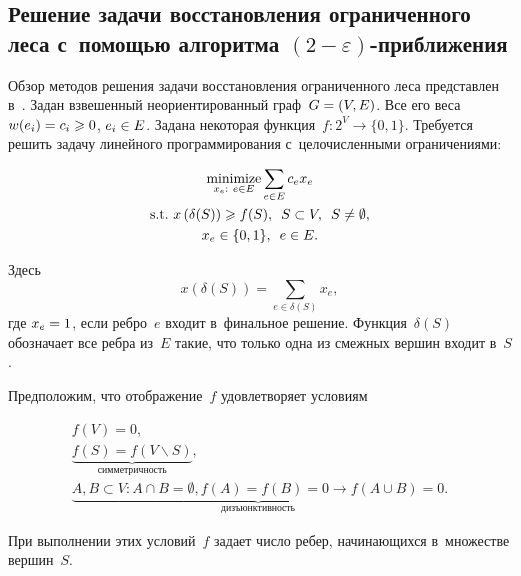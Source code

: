 \begin{multicols}{2}
\vspace*{-9pt}

\section{Решение задачи восстановления ограниченного леса с~помощью алгоритма 
$(2-\varepsilon)$-приближения}

\vspace*{-3pt}

Обзор методов решения задачи восстановления ограниченного леса представлен 
в~\cite{goemans1995general}. Задан взвешенный неориентированный граф~$G\hm=(V,E)$. 
Все его веса~$w(e_i)\hm=c_i\geqslant 0$, $e_i\hm\in E$. Задана некоторая 
функция~$f:2^{V}\to \{0, 1\}$. Требуется решить задачу линейного 
программирования с~целочисленными ограничениями:

\vspace*{-4pt}

\noindent
\begin{multline}
\underset{x_e:~e\in E}{\mbox{minimize}} \displaystyle \sum\limits_{e\in E}c_ex_e\\
\mbox{s.t.}\  x\left(\delta(S)\right)\geqslant f(S),\enskip  S \subset V, \enskip S \not= \emptyset,\\
 x_e\in\{0,1\},\enskip  e\in E.
\label{ilp_cfp}
\end{multline}

\vspace*{-3pt}

\noindent
Здесь
$$
x(\delta(S))=\sum\limits_{e\in \delta(S)}x_e,
$$
где $x_e\hm=1$, если 
ребро~$e$ входит в~финальное решение. Функция~$\delta(S)$ обозначает все ребра 
из~$E$ такие, что только одна из смежных вершин входит в~$S$.

Предположим, что отображение~$f$ удовлетворяет условиям

\vspace*{-3pt}

\noindent
\begin{gather*}
f(V) = 0,\\
 \underbrace{f(S)=f(V\backslash S)}_{\mathrm{симметричность}},\\
\underbrace{A,B\!\subset\! V\!: A\!\cap\! B\! =\! \emptyset, f(A)\!=\!f(B)\!=\!0\!\to\! f(A\!\cup\! B)\! =\! 0}_{\mathrm{дизъюнктивность}}.
\end{gather*}

\vspace*{-2pt}

\noindent
При выполнении этих условий~$f$ задает число ребер, начинающихся в~множестве 
вершин~$S$.


\end{multicols}
